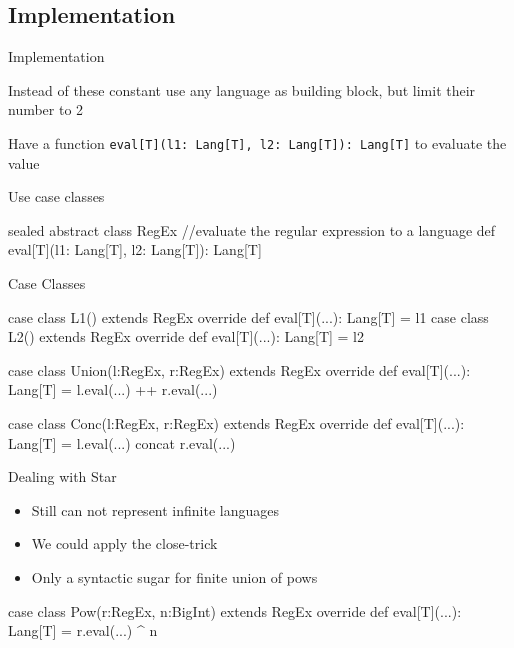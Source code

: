 \documentclass{beamer}
\newcommand{\inline}[1]{\lstinline[language=Stainless,columns=fixed]|#1|}
\begin{document}
\subsection{Implementation}

\begin{frame}[fragile]{Implementation}
	
	Instead of these constant use any language as building block, but limit their number to 2
	
	Have a function \inline{eval[T](l1: Lang[T], l2: Lang[T]): Lang[T]} to evaluate the value
	
	
	Use case classes
\begin{Stainless}	
sealed abstract class RegEx {
  //evaluate the regular expression to a language
  def eval[T](l1: Lang[T], l2: Lang[T]): Lang[T]
}
\end{Stainless}	
	
	
\end{frame}

\begin{frame}[fragile]{Case Classes}
\begin{Stainless}
case class L1() extends RegEx {
  override def eval[T](...): Lang[T] = l1
}	
case class L2() extends RegEx {
  override def eval[T](...): Lang[T] = l2
}

case class Union(l:RegEx, r:RegEx) extends RegEx {
  override def eval[T](...): Lang[T] = 
                    l.eval(...) ++ r.eval(...)
}

case class Conc(l:RegEx, r:RegEx) extends RegEx {
  override def eval[T](...): Lang[T] = 
                   l.eval(...) concat r.eval(...)
}

\end{Stainless}
\end{frame}

\begin{frame}[fragile]{Dealing with Star}

\begin{itemize}
	\item Still can not represent infinite languages
	
	\item {We could apply the close-trick	}
	
	\item {Only a syntactic sugar for finite union of pows}
	
\end{itemize}

\begin{Stainless}
case class Pow(r:RegEx, n:BigInt) extends RegEx {
  override def eval[T](...): Lang[T] = 
           r.eval(...) ^ n
}
\end{Stainless}	





\end{frame}
\end{document}
